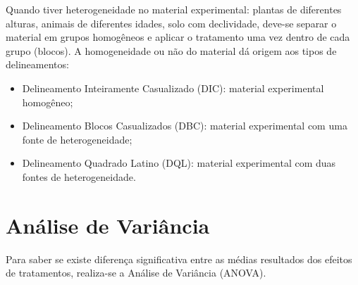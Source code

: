 \documentclass[12pt,brazil,oneside]{book}
\begin{document}
Quando tiver heterogeneidade no material experimental: plantas de
diferentes alturas, animais de diferentes idades, solo com declividade,
deve-se separar o material em grupos homogêneos e aplicar o tratamento
uma vez dentro de cada grupo (blocos). A homogeneidade ou não do
material dá origem aos tipos de delineamentos:

\begin{itemize}
\item
  Delineamento Inteiramente Casualizado (DIC): material experimental
  homogêneo;
\item
  Delineamento Blocos Casualizados (DBC): material experimental com uma
  fonte de heterogeneidade;
\item
  Delineamento Quadrado Latino (DQL): material experimental com duas
  fontes de heterogeneidade.
\end{itemize}

\hypertarget{analise-de-variancia}{%
\section{Análise de Variância}\label{analise-de-variancia}}

Para saber se existe diferença significativa entre as médias resultados
dos efeitos de tratamentos, realiza-se a Análise de Variância (ANOVA).
\end{document}
